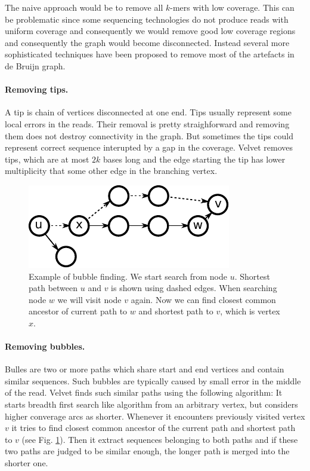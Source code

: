 The naive approach would be to remove all $k$-mers with low coverage.
This can be problematic since some sequencing technologies do not produce reads with uniform coverage
and consequently we would remove good low coverage regions and consequently the graph would become disconnected.
Instead several more sophisticated techniques have been proposed to remove
most of the artefacts in de Bruijn graph.

\paragraph{Removing tips.} A tip is chain of vertices disconnected at one end. 
Tips usually represent some local errors in the reads. Their removal is pretty straighforward
and removing them does not destroy connectivity in the graph. But sometimes the tips
could represent correct sequence interupted by a gap in the coverage.
Velvet \citep{Velvet} removes tips, which are at most $2k$ bases long and the edge starting
the tip has lower multiplicity that some other edge in the branching vertex.

\begin{figure}
  \centerline{\includegraphics[scale=0.9]{../figures/bubblefind.pdf}}
  \caption{Example of bubble finding. We start search from node $u$. Shortest path between
$u$ and $v$ is shown using dashed edges. When searching node $w$ we will visit node
$v$ again. Now we can find closest common ancestor of current path to $w$ and shortest path to $v$,
which is vertex $x$.}
\label{fig:bubblerem}
\end{figure}

\paragraph{Removing bubbles.} Bulles are two or more paths which share start and end vertices
and contain similar sequences.
Such bubbles are typically caused by small error in the middle of the read.
Velvet finds such similar paths using the following algorithm:
It starts breadth first search like algorithm from an arbitrary vertex, but considers higher converage
arcs as shorter. Whenever it encounters previously visited vertex $v$ it tries to find closest common ancestor
of the current path and shortest path to $v$ (see Fig. \ref{fig:bubblerem}). Then it extract
sequences belonging to both paths and
if these two paths are judged to be similar enough, the longer path is merged into the shorter one. 
 
